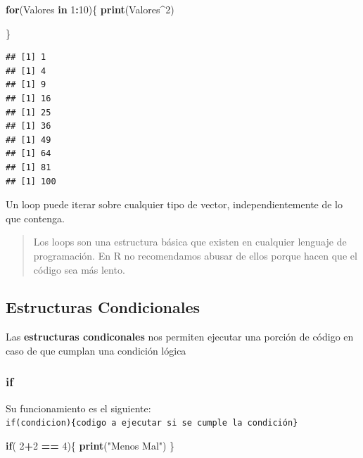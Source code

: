 \documentclass[]{book}
\newenvironment{Shaded}{\begin{snugshade}}{\end{snugshade}}
\newcommand{\ControlFlowTok}[1]{\textcolor[rgb]{0.13,0.29,0.53}{\textbf{#1}}}
\newcommand{\DecValTok}[1]{\textcolor[rgb]{0.00,0.00,0.81}{#1}}
\newcommand{\KeywordTok}[1]{\textcolor[rgb]{0.13,0.29,0.53}{\textbf{#1}}}
\newcommand{\NormalTok}[1]{#1}
\newcommand{\OperatorTok}[1]{\textcolor[rgb]{0.81,0.36,0.00}{\textbf{#1}}}
\newcommand{\StringTok}[1]{\textcolor[rgb]{0.31,0.60,0.02}{#1}}
\begin{document}
\begin{Shaded}
\begin{Highlighting}[]
\ControlFlowTok{for}\NormalTok{(Valores }\ControlFlowTok{in} \DecValTok{1}\OperatorTok{:}\DecValTok{10}\NormalTok{)\{}
   \KeywordTok{print}\NormalTok{(Valores}\OperatorTok{^}\DecValTok{2}\NormalTok{)}
  
\NormalTok{\}}
\end{Highlighting}
\end{Shaded}

\begin{verbatim}
## [1] 1
## [1] 4
## [1] 9
## [1] 16
## [1] 25
## [1] 36
## [1] 49
## [1] 64
## [1] 81
## [1] 100
\end{verbatim}

Un loop puede iterar sobre cualquier tipo de vector, independientemente de lo que contenga.

\begin{quote}
Los loops son una estructura básica que existen en cualquier lenguaje de programación. En R no recomendamos abusar de ellos porque hacen que el código sea más lento.
\end{quote}

\hypertarget{estructuras-condicionales}{%
\subsection{Estructuras Condicionales}\label{estructuras-condicionales}}

Las \textbf{estructuras condiconales} nos permiten ejecutar una porción de código en caso de que cumplan una condición lógica

\hypertarget{if}{%
\subsubsection{if}\label{if}}

Su funcionamiento es el siguiente:\\
\texttt{if(condicion)\{codigo\ a\ ejecutar\ si\ se\ cumple\ la\ condición\}}

\begin{Shaded}
\begin{Highlighting}[]
\ControlFlowTok{if}\NormalTok{( }\DecValTok{2}\OperatorTok{+}\DecValTok{2} \OperatorTok{==}\StringTok{ }\DecValTok{4}\NormalTok{)\{}
  \KeywordTok{print}\NormalTok{(}\StringTok{"Menos Mal"}\NormalTok{)}
\NormalTok{\}}
\end{Highlighting}
\end{Shaded}
\end{document}
